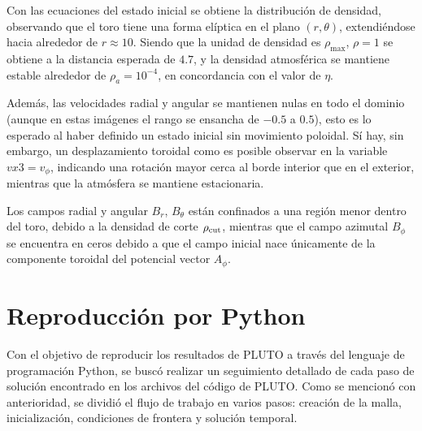 \documentclass[11pt, letterpaper]{article}
\begin{document}
\medskip

Con las ecuaciones del estado inicial se obtiene la distribución de densidad, observando que el toro tiene una forma elíptica en el plano $(r, \theta)$, extendiéndose hacia alrededor de $r\approx10$. Siendo que la unidad de densidad es $\rho_{\max}$, $\rho = 1$ se obtiene a la distancia esperada de $4.7$, y la densidad atmosférica se mantiene estable alrededor de $\rho_a = 10^{-4}$, en concordancia con el valor de $\eta$.

\medskip

Además, las velocidades radial y angular se mantienen nulas en todo el dominio (aunque en estas imágenes el rango se ensancha de $-0.5$ a $0.5$), esto es lo esperado al haber definido un estado inicial sin movimiento poloidal. Sí hay, sin embargo, un desplazamiento toroidal como es posible observar en la variable $vx3 = v_{\phi}$, indicando una rotación mayor cerca al borde interior que en el exterior, mientras que la atmósfera se mantiene estacionaria.

\medskip

Los campos radial y angular $B_r$, $B_{\theta}$ están confinados a una región menor dentro del toro, debido a la densidad de corte $\rho_{\rm{cut}}$, mientras que el campo azimutal $B_{\phi}$ se encuentra en ceros debido a que el campo inicial nace únicamente de la componente toroidal del potencial vector $A_{\phi}$.

\section{Reproducción por Python}


Con el objetivo de reproducir los resultados de PLUTO a través del lenguaje de programación Python, se buscó realizar un seguimiento detallado de cada paso de solución encontrado en los archivos del código de PLUTO. Como se mencionó con anterioridad, se dividió el flujo de trabajo en varios pasos: creación de la malla, inicialización, condiciones de frontera y solución temporal.

\medskip
\end{document}
